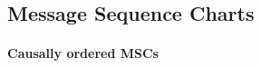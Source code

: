 \documentclass{article}
\begin{document}

\subsection{Message Sequence Charts}




\paragraph*{Causally ordered MSCs}
\end{document}
